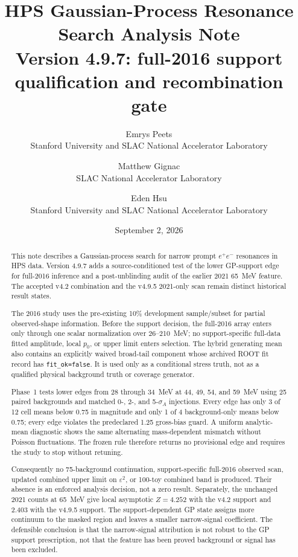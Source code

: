 \documentclass[11pt]{article}
\title{\vspace{-1.0em}HPS Gaussian-Process Resonance Search Analysis Note\\
\large Version 4.9.7: full-2016 support qualification and recombination gate}
\author{
Emrys Peets\\Stanford University and SLAC National Accelerator Laboratory
\and
Matthew Gignac\\SLAC National Accelerator Laboratory
\and
Eden Hsu\\Stanford University and SLAC National Accelerator Laboratory
}
\date{September 2, 2026}
\newcommand{\eps}{\varepsilon}
\begin{document}
\maketitle

\begin{abstract}
This note describes a Gaussian-process search for narrow prompt $e^+e^-$ resonances
in HPS data.  Version 4.9.7 adds a source-conditioned test of the lower GP-support
edge for full-2016 inference and a post-unblinding audit of the earlier 2021 65~MeV
feature.  The accepted v4.2 combination and the v4.9.5 2021-only scan remain distinct
historical result states.

The 2016 study uses the pre-existing 10\% development sample/subset for partial
observed-shape information.  Before the support decision, the full-2016 array enters
only through one scalar normalization over 26--210~MeV; no support-specific full-data
fitted amplitude, local $p_0$, or upper limit enters selection.  The hybrid generating
mean also contains an explicitly waived broad-tail component whose archived ROOT fit
record has \texttt{fit\_ok=false}.  It is used only as a conditional stress truth, not
as a qualified physical background truth or coverage generator.

Phase~1 tests lower edges from 28 through 34~MeV at 44, 49, 54, and 59~MeV using 25
paired backgrounds and matched 0-, 2-, and 5-$\sigma_A$ injections.  Every edge has
only 3 of 12 cell means below 0.75 in magnitude and only 1 of 4 background-only means
below 0.75; every edge violates the predeclared 1.25 gross-bias guard.  A uniform
analytic-mean diagnostic shows the same alternating mass-dependent mismatch without
Poisson fluctuations.  The frozen rule therefore returns no provisional edge and
requires the study to stop without retuning.

Consequently no 75-background continuation, support-specific full-2016 observed
scan, updated combined upper limit on $\eps^2$, or 100-toy combined band is produced.
Their absence is an enforced analysis decision, not a zero result.  Separately, the
unchanged 2021 counts at 65~MeV give local asymptotic $Z=4.252$ with the v4.2 support
and 2.403 with the v4.9.5 support.  The support-dependent GP state assigns more
continuum to the masked region and leaves a smaller narrow-signal coefficient.  The
defensible conclusion is that the narrow-signal attribution is not robust to the GP
support prescription, not that the feature has been proved background or signal has
been excluded.
\end{abstract}
\end{document}
